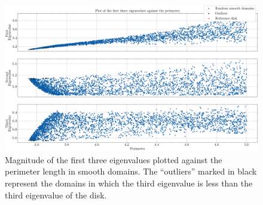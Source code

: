 \begin{figure}[!htb]
    \centering
    \begin{minipage}[c]{0.8\textwidth}
        \centering
        \includegraphics[width=\textwidth]{Images/Dirac/smooth/smooth_domains_scatter_all_eigs_.png}
        \caption{Magnitude of the first three eigenvalues plotted against the perimeter length in smooth domains. The ``outliers'' marked in black represent the domains in which the third eigenvalue is less than the third eigenvalue of the disk.}
        \label{dirac_smooth_domains_scatter_all_eigs}
    \end{minipage}

    \vspace{0.5cm}


\end{figure}
